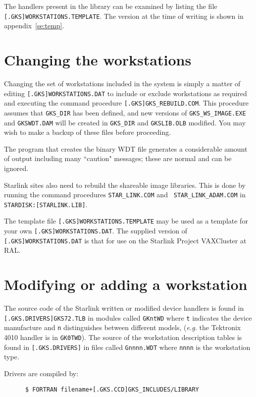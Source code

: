 The handlers present in the library can be examined by listing the file
{\tt [.GKS]WORKSTATIONS\-.TEMPLATE}. The version at the time of writing is
shown in appendix~\ref{se:temp}.

\section{Changing the workstations}

Changing the set of workstations included in the system is simply a matter of
editing {\tt [.GKS]\-WORKSTATIONS.DAT} to include or exclude workstations as
required and executing the command procedure {\tt [.GKS]GKS\_REBUILD.COM}. This
procedure assumes that {\tt GKS\_DIR} has been defined, and new versions of
{\tt GKS\_WS\_IMAGE.EXE} and {\tt GKSWDT.DAM} will be created in {\tt GKS\_DIR}
and {\tt GKSLIB.OLB} modified. You may wish to make a backup of these files
before proceeding.

The program that creates the binary WDT file generates a considerable amount
of output including many ``caution" messages; these are normal and can be
ignored.

Starlink sites also need to rebuild the shareable image libraries. This is done
by running the command procedures {\tt STAR\_LINK.COM} and {\tt
STAR\_LINK\_ADAM.COM} in {\tt STARDISK:[STARLINK.LIB]}.

The template file {\tt [.GKS]WORKSTATIONS\-.TEMPLATE} may be used as a template
for your own {\tt [.GKS]\-WORKSTATIONS.DAT}. The supplied version of {\tt
[.GKS]\-WORKSTATIONS.DAT} is that for use on the Starlink Project VAXCluster
at RAL.


\section{Modifying or adding a workstation}

The source code of the Starlink written or modified device handlers is found in
{\tt [.GKS.DRIVERS]\-GKS72.TLB} in modules called {\tt GKntWD} where {\tt t}
indicates the device manufacture and {\tt n} distinguishes between different
models, ({\em e.g.} the Tektronix 4010 handler is in {\tt GK0TWD}). The source
of the workstation description tables is found in {\tt [.GKS.DRIVERS]} in files
called {\tt Gnnnn.WDT} where {\tt nnnn} is the workstation type.

Drivers are compiled by:

\begin{verbatim}
      $ FORTRAN filename+[.GKS.CCD]GKS_INCLUDES/LIBRARY
\end{verbatim}

